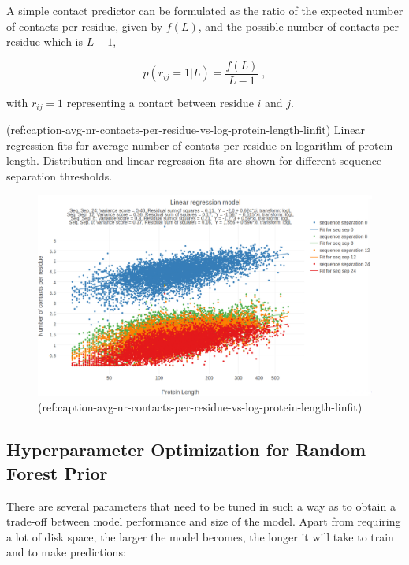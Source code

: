 \documentclass[12pt,a4paper,twoside]{book}
\theoremstyle{definition}
\theoremstyle{definition}
\theoremstyle{remark}
\begin{document}
A simple contact predictor can be formulated as the ratio of the
expected number of contacts per residue, given by \(f(L)\), and the
possible number of contacts per residue which is \(L-1\),

\[
p(r_{ij} = 1 | L) = \frac{f(L)}{L-1} \; ,
\]

with \(r_{ij}=1\) representing a contact between residue \(i\) and
\(j\).

(ref:caption-avg-nr-contacts-per-residue-vs-log-protein-length-linfit)
Linear regression fits for average number of contats per residue on
logarithm of protein length. Distribution and linear regression fits are
shown for different sequence separation thresholds.

\begin{figure}

{\centering \includegraphics[width=0.9\linewidth]{img/random_forest_contact_prior/model_linreg_transformlogL_no_contacts_per_residue_vs_protein_length_thr8} 

}

\caption{(ref:caption-avg-nr-contacts-per-residue-vs-log-protein-length-linfit)}\label{fig:avg-nr-contacts-per-residue-vs-log-protein-length-linfit}
\end{figure}

\subsection{Hyperparameter Optimization for Random Forest
Prior}\label{rf-hyperparameter-optimization}

There are several parameters that need to be tuned in such a way as to
obtain a trade-off between model performance and size of the model.
Apart from requiring a lot of disk space, the larger the model becomes,
the longer it will take to train and to make predictions:
\end{document}
